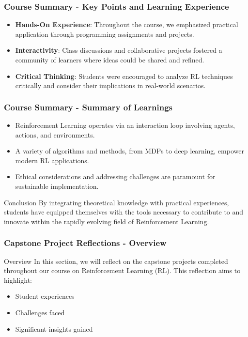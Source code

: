 \documentclass[aspectratio=169]{beamer}
\begin{document}
\begin{frame}[fragile]
    \frametitle{Course Summary - Key Points and Learning Experience}
    \begin{itemize}
        \item \textbf{Hands-On Experience}: Throughout the course, we emphasized practical application through programming assignments and projects.
        \item \textbf{Interactivity}: Class discussions and collaborative projects fostered a community of learners where ideas could be shared and refined.
        \item \textbf{Critical Thinking}: Students were encouraged to analyze RL techniques critically and consider their implications in real-world scenarios.
    \end{itemize}
\end{frame}

\begin{frame}[fragile]
    \frametitle{Course Summary - Summary of Learnings}
    \begin{itemize}
        \item Reinforcement Learning operates via an interaction loop involving agents, actions, and environments. 
        \item A variety of algorithms and methods, from MDPs to deep learning, empower modern RL applications.
        \item Ethical considerations and addressing challenges are paramount for sustainable implementation.
    \end{itemize}

    \begin{block}{Conclusion}
        By integrating theoretical knowledge with practical experiences, students have equipped themselves with the tools necessary to contribute to and innovate within the rapidly evolving field of Reinforcement Learning.
    \end{block}
\end{frame}

\begin{frame}[fragile]
    \frametitle{Capstone Project Reflections - Overview}
    \begin{block}{Overview}
        In this section, we will reflect on the capstone projects completed throughout our course on Reinforcement Learning (RL).
        This reflection aims to highlight:
        \begin{itemize}
            \item Student experiences
            \item Challenges faced
            \item Significant insights gained
        \end{itemize}
    \end{block}
\end{frame}
\end{document}
